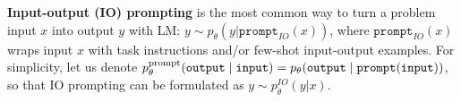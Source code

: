 \documentclass{article}
\begin{document}
\textbf{Input-output (IO) prompting} is the most common way to turn a problem input $x$ into output $y$ with LM: $y \sim p_\theta(y | \texttt{prompt}_{{IO}}(x))$, where $\texttt{prompt}_{IO}(x)$ wraps input $x$ with task instructions and/or few-shot input-output examples. For simplicity, let us denote $p_\theta^{{\rm prompt}}(\texttt{output} \mid \texttt{input}) = p_\theta(\texttt{output} \mid \texttt{prompt}(\texttt{input}))$, so that IO prompting can be formulated as $y \sim p_\theta^{IO}(y|x)$. 


\end{document}
